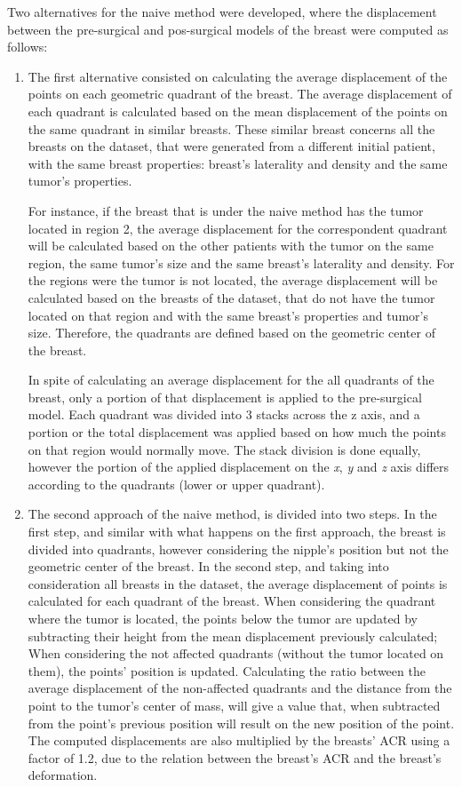 Two alternatives for the naive method were developed, where the displacement between the pre-surgical and pos-surgical models of the breast were computed as follows:
\begin{enumerate}
\item The first alternative consisted on calculating the average displacement of the points on each geometric quadrant of the breast. The average displacement of each quadrant is calculated based on the mean displacement of the points on the same quadrant in similar breasts. These similar breast concerns all the breasts on the dataset, that were generated from a different initial patient, with the same breast properties: breast's laterality and density and the same tumor's properties.

For instance, if the breast that is under the naive method has the tumor located in region 2, the average displacement for the correspondent quadrant will be calculated based on the other patients with the tumor on the same region, the same tumor's size and the same breast's laterality and density. For the regions were the tumor is not located, the average displacement will be calculated based on the breasts of the dataset, that do not have the tumor located on that region and with the same breast's properties and tumor's size. Therefore, the quadrants are defined based on the geometric center of the breast.

In spite of calculating an average displacement for the all quadrants of the breast, only a portion of that displacement is applied to the pre-surgical model. Each quadrant was divided into 3 stacks across the z axis, and a portion or the total displacement was applied based on how much the points on that region would normally move. The stack division is done equally, however the portion of the applied displacement on the \textit{x}, \textit{y} and \textit{z} axis differs according to the quadrants (lower or upper quadrant).

\item  The second approach of the naive method, is divided into two steps. In the first step, and similar with what happens on the first approach, the breast is divided into quadrants, however considering the nipple's position but not the geometric center of the breast. In the second step, and taking into consideration all breasts in the dataset, the average displacement of points is calculated for each quadrant of the breast. When considering the quadrant where the tumor is located, the points below the tumor are updated by subtracting their height from the mean displacement previously calculated; When considering the not affected quadrants (without the tumor located on them), the points' position is updated. Calculating the ratio between the average displacement of the non-affected quadrants and the distance from the point to the tumor's center of mass, will give a value that, when subtracted from the point's previous position will result on the new position of the point. The computed displacements are also multiplied by the breasts' ACR using a factor of 1.2, due to the relation between the breast's ACR and the breast's deformation.

\end{enumerate}

